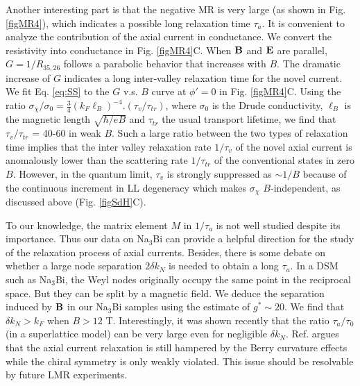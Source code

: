 Another interesting part is that the negative MR is very large (as shown in Fig.\ref{figMR4}), which indicates a possible long relaxation time $\tau_a$. It is convenient to analyze the contribution of the axial current in conductance. We convert the resistivity into conductance in Fig. \ref{figMR4}C. When $\bf B$ and $\bf E$ are parallel, $G = 1/R_{35,26}$ follows a parabolic behavior that increases with $B$. The dramatic increase of $G$ indicates a long inter-valley relaxation time for the novel current. We fit Eq. \ref{eq:SS} to the $G$ v.s. $B$ curve at $\phi'=0$ in Fig. \ref{figMR4}C. Using the ratio $\sigma_{\chi}/\sigma_0 = \frac34 (k_F\ell_B)^{-4}.(\tau_v/\tau_{tr})$, where $\sigma_0$ is the Drude conductivity, $\ell_B$ is the magnetic length $\sqrt{\hbar/eB}$ and $\tau_{tr}$ the usual transport lifetime, we find that $\tau_v/\tau_{tr}$ = 40-60 in weak $B$. Such a large ratio between the two types of relaxation time implies that the inter valley relaxation rate $1/\tau_v$ of the novel axial current is anomalously lower than the scattering rate $1/\tau_{tr}$ of the conventional states in zero $B$. However, in the quantum limit, $\tau_v$ is strongly suppressed as $\sim 1/B$ because of the continuous increment in LL degeneracy which makes $\sigma_\chi$ $B$-independent, as discussed above (Fig. \ref{figSdH}C). 

To our knowledge, the matrix element $M$ in $1/\tau_a$ is not well studied despite its importance. Thus our data on Na$_3$Bi can provide a helpful direction for the study of the relaxation process of axial currents. Besides, there is some debate on whether a large node separation $2\delta k_N$ is needed to obtain a long $\tau_a$. In a DSM such as Na$_3$Bi, the Weyl nodes originally occupy the same point in the reciprocal space. But they can be split by a magnetic field. We deduce the separation induced by $\bf B$ in our Na$_3$Bi samples using the estimate of $g^* \sim 20$. We find that $\delta k_N > k_F$ when $B > 12$ T. Interestingly, it was shown\cite{Burkov2015} recently that the ratio $\tau_a/\tau_0$ (in a superlattice model) can be very large even for negligible $\delta k_N$. Ref. \cite{Burkov2015} argues that the axial current relaxation is still hampered by the Berry curvature effects while the chiral symmetry is only weakly violated. This issue should be resolvable by future LMR experiments.





